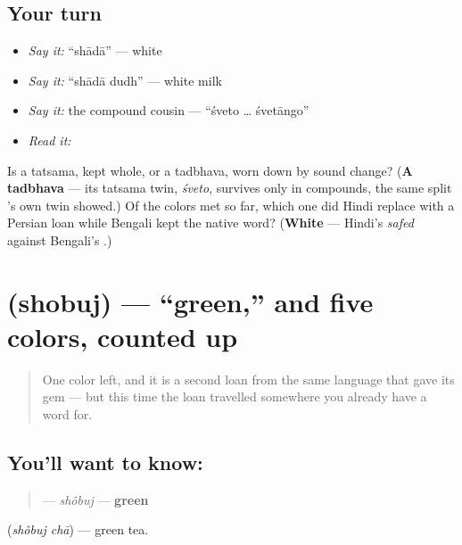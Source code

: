 \subsection*{Your turn}
\begin{itemize}
\raggedright
  \item \emph{Say it:} \textquotedblleft{}shādā\textquotedblright{} — white
  \item \emph{Say it:} \textquotedblleft{}shādā dudh\textquotedblright{} — white milk
  \item \emph{Say it:} the compound cousin — \textquotedblleft{}śveto … śvetāngo\textquotedblright{}
  \item \emph{Read it:} \textbf{ }
\end{itemize}

\begin{tcolorbox}[breakable,colback=teal!4,colframe=teal!35!black,title={Before you move on}]
Is  a tatsama, kept whole, or a tadbhava, worn down by sound change? (\textbf{A tadbhava} — its tatsama twin, \emph{śveto}, survives only in compounds, the same split 's own twin showed.) Of the colors met so far, which one did Hindi replace with a Persian loan while Bengali kept the native word? (\textbf{White} — Hindi's \emph{safed} against Bengali's .)
\end{tcolorbox}
\section[\texorpdfstring{\bn{সবুজ} (shobuj)}{সবুজ (shobuj)}]{ (shobuj) — \textquotedblleft{}green,\textquotedblright{} and five colors, counted up}

\label{lesson:BN-C14-shobuj}



\begin{quote}
One color left, and it is a second loan from the same language that gave  its gem — but this time the loan travelled somewhere you already have a word for.
\end{quote}

\subsection*{You'll want to know: }
\begin{quote}
\textbf{} — \emph{shôbuj} — \textbf{green}
\end{quote}

  (\emph{shôbuj chā}) — green tea.

